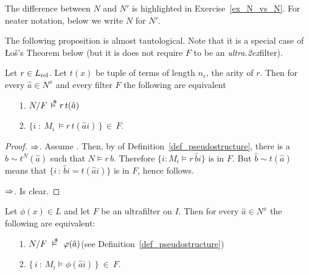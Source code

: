 The difference between $N$ and $N'$ is highlighted in Exercise~\ref{ex_N_vs_N}.
For neater notation, below we write $N$ for $N'$.

The following proposition is almost tautological.
Note that it is a special case of \L o\v{s}'s Theorem below (but it is does not require $F$ to be an \textit{ultra\kern.2ex}filter).

\begin{proposition}\label{prop_eq_ultra}
  Let $r\in L_{\rm rel}$.
  Let $t(x)$ be tuple of terms of length $n_r$, the arity of $r$.
  Then for every $\hat a\in N^{x}$ and every filter $F$ the following are equivalent
  \begin{itemize}
  \item[1.] $N/F\,\pmodels r\,t(\hat a)$

  \item[2.] $\big\{i\; :\ M_i\,\models r\,t(\hat ai)\,\big\}\,\in\, F$.
  \end{itemize}
\end{proposition}

\begin{proof}
  $\Rightarrow$.
  Assume .
  Then, by  of Definition~\ref{def_pseudostructure}, there is a $\hat b\sim t^N(\hat a)$ such that $N\models r\,\hat b$.
  Therefore $\{i:M_i\models r\,\hat bi\}$ is in $F$.
  But $\hat b\sim t(\hat a)$ means that $\big\{i\, :\, \hat bi= t(\hat ai)\big\}$ is in $F$, hence  follows.

  $\Rightarrow$.
Is clear.
\end{proof}

\begin{void}[\L o\'{s}'s Theorem]\label{thm_los}
Let $\phi(x)\in L$ and let $F$ be an ultrafilter on $I$.
Then for every $\hat a\in N^{x}$ the following are equivalent:
\begin{itemize}
\item[1.] $N/F\ \pmodels\ \phi(\hat a)$\hfill (see  Definition~\ref{def_pseudostructure})
\item[2.] $\big\{\,i\ :\ M_i\models \phi(\hat a i)\,\big\}\ \in\ F$.
\end{itemize}
\end{void}

